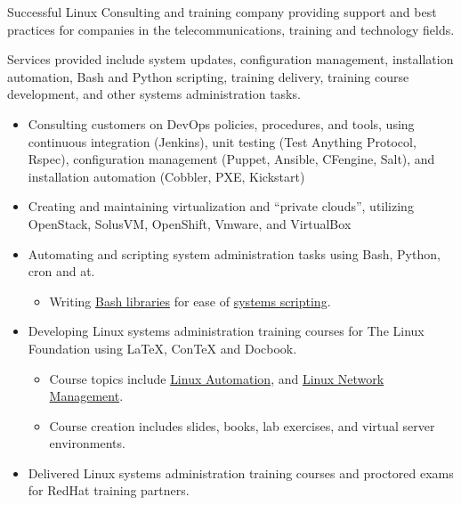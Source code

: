 \documentclass[fontsize=11pt]{scrartcl}
\begin{document}
  Successful Linux Consulting and training company providing support and
  best practices for companies in the telecommunications, training and
  technology fields.

  Services provided include system updates, configuration management,
  installation automation, Bash and Python scripting, training delivery,
  training course development, and other systems administration tasks.

  \begin{itemize}
    \item
      Consulting customers on DevOps policies, procedures, and tools, using
      continuous integration (Jenkins), unit testing (Test Anything
      Protocol, Rspec), configuration management (Puppet, Ansible, CFengine,
      Salt), and installation automation (Cobbler, PXE, Kickstart)
    \item
      Creating and maintaining virtualization and ``private clouds'',
      utilizing OpenStack, SolusVM, OpenShift, Vmware, and VirtualBox
    \item
      Automating and scripting system administration tasks using Bash,
      Python, cron and at.

      \begin{itemize}
        \itemsep1pt\parskip0pt
        \item
          Writing \href{https://github.com/goozbach/log4bats}{Bash libraries}
          for ease of \href{https://github.com/goozbach/bash-app}{systems
            scripting}.
      \end{itemize}
    \item
      Developing Linux systems administration training courses for The Linux
      Foundation using LaTeX, ConTeX and Docbook.

      \begin{itemize}
        \item
          Course topics include
          \href{http://training.linuxfoundation.org/linux-courses/system-administration-training/linux-enterprise-automation}{Linux
            Automation}, and
          \href{http://training.linuxfoundation.org/linux-courses/system-administration-training/linux-network-management}{Linux
            Network Management}.
        \item
          Course creation includes slides, books, lab exercises, and virtual
          server environments.
      \end{itemize}
    \item
      Delivered Linux systems administration training courses and proctored
      exams for RedHat training partners.
  \end{itemize}
\end{document}
